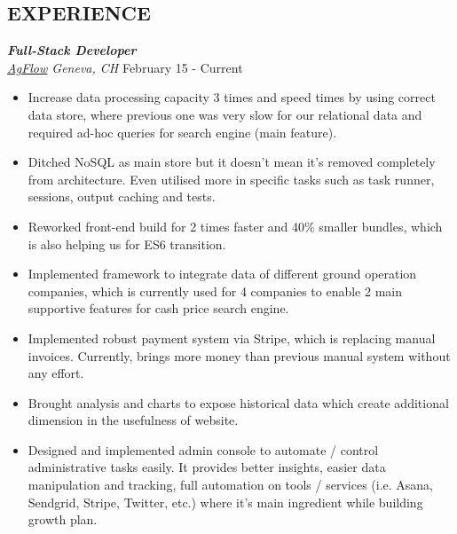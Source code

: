 \documentclass[line, margin]{res}
\begin{document}
\address{Rue de Neuchatel 10, 1201 Geneva, Switzerland \hspace{2.7cm} (+41) 78 926 9917}
\address{\href{mailto:elmas.ferhat@gmail.com}{elmas.ferhat@gmail.com} \hspace{1.2cm} \href{http://ferhatelmas.com}{ferhatelmas.com} \hspace{1.6cm}  \href{https://github.com/ferhatelmas}{github.com/ferhatelmas}}

\begin{resume}

\vspace{-0.4cm}

\section{EXPERIENCE}

{\sl \textbf{Full-Stack Developer} \\ \href{http://www.agflow.com}{AgFlow} Geneva, CH} \hfill February 15 - Current \\
\vspace{-0.3cm}
\begin{itemize}
  \item Increase data processing capacity 3 times and speed  times by using correct data store, where previous one was very slow for our relational data and required ad-hoc queries for search engine (main feature).
  \item Ditched NoSQL as main store but it doesn't mean it's removed completely from architecture. Even utilised more in specific tasks such as task runner, sessions, output caching and tests.
  \item Reworked front-end build for 2 times faster and 40\% smaller bundles, which is also helping us for ES6 transition.
  \item Implemented framework to integrate data of different ground operation companies, which is currently used for 4 companies to enable 2 main supportive features for cash price search engine.
  \item Implemented robust payment system via Stripe, which is replacing manual invoices. Currently, brings more money than previous manual system without any effort.
  \item Brought analysis and charts to expose historical data which create additional dimension in the usefulness of website.
  \item Designed and implemented admin console to automate / control administrative tasks easily. It provides better insights, easier data manipulation and tracking, full automation on tools / services  (i.e. Asana, Sendgrid, Stripe, Twitter, etc.) where it's main ingredient while building growth plan.
\end{itemize}


\end{resume}
\end{document}
